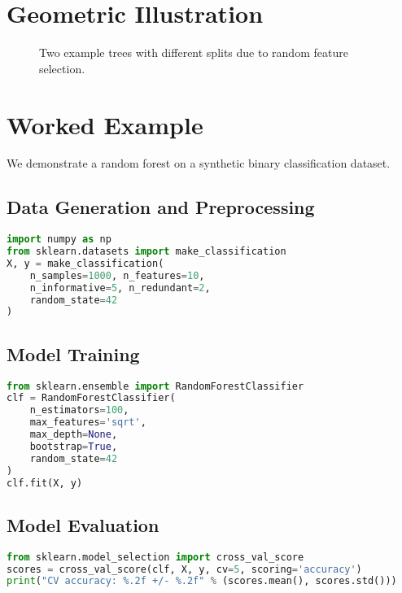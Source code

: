 \documentclass[11pt]{article}
\begin{document}
\section{Geometric Illustration}
\begin{figure}[h]
\centering
{}
\caption{Two example trees with different splits due to random feature selection.}
\end{figure}

\section{Worked Example}
We demonstrate a random forest on a synthetic binary classification dataset.

\subsection{Data Generation and Preprocessing}
\begin{lstlisting}[language=Python]
import numpy as np
from sklearn.datasets import make_classification
X, y = make_classification(
    n_samples=1000, n_features=10,
    n_informative=5, n_redundant=2,
    random_state=42
)
\end{lstlisting}

\subsection{Model Training}
\begin{lstlisting}[language=Python]
from sklearn.ensemble import RandomForestClassifier
clf = RandomForestClassifier(
    n_estimators=100,
    max_features='sqrt',
    max_depth=None,
    bootstrap=True,
    random_state=42
)
clf.fit(X, y)
\end{lstlisting}

\subsection{Model Evaluation}
\begin{lstlisting}[language=Python]
from sklearn.model_selection import cross_val_score
scores = cross_val_score(clf, X, y, cv=5, scoring='accuracy')
print("CV accuracy: %.2f +/- %.2f" % (scores.mean(), scores.std()))
\end{lstlisting}
\end{document}
